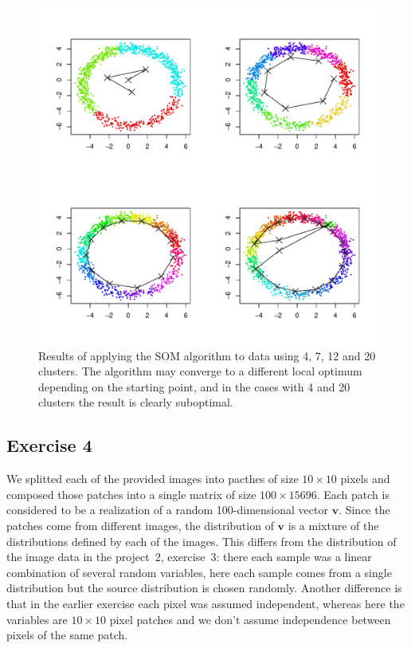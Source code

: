 \documentclass{article}
\renewcommand\vec[1]{\ensuremath{\mathbf{#1}}}
\begin{document}
\begin{figure}\centering
	\includegraphics[width=\columnwidth]{som}
	\caption{Results of applying the SOM algorithm to data using 4, 7, 12 and 20 clusters. The algorithm may converge to a different local optimum depending on the starting point, and in the cases with 4 and 20 clusters the result is clearly suboptimal.}\label{fig:som}
\end{figure}

\subsection{Exercise 4}
We splitted each of the provided images into pacthes of size $10\times10$ pixels and composed those patches into a single matrix of size $100\times 15696$.
Each patch is considered to be a realization of a random 100-dimensional vector \vec v.
Since the patches come from different images, the distribution of \vec v is a mixture of the distributions defined by each of the images.
This differs from the distribution of the image data in the project~2, exercise~3: there each sample was a linear combination of several random variables, here each sample comes from a single distribution but the source distribution is chosen randomly.
Another difference is that in the earlier exercise each pixel was assumed independent, whereas here the variables are $10\times 10$ pixel patches and we don't assume independence between pixels of the same patch.
\end{document}
